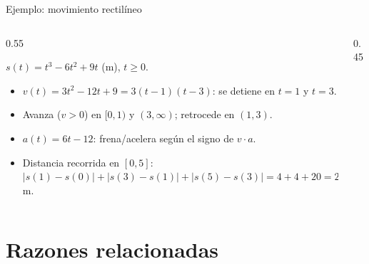 \documentclass[10pt,aspectratio=169]{beamer}
\begin{document}
\begin{frame}{Ejemplo: movimiento rectilíneo}
  \begin{columns}
    \begin{column}{0.55\textwidth}
      \begin{ejemplo}[2]
        $s(t)=t^3-6t^2+9t$ (m), $t\ge0$.
        \begin{itemize}
          \item $v(t)=3t^2-12t+9=3(t-1)(t-3)$: se detiene en $t=1$ y $t=3$.
          \item Avanza ($v>0$) en $[0,1)$ y $(3,\infty)$; retrocede en $(1,3)$.
          \item $a(t)=6t-12$: frena/acelera según el signo de $v\cdot a$.
          \item Distancia recorrida en $[0,5]$: $|s(1)-s(0)|+|s(3)-s(1)|+|s(5)-s(3)|=4+4+20=28$ m.
        \end{itemize}
      \end{ejemplo}
    \end{column}
    \begin{column}{0.45\textwidth}
      \centering
    \end{column}
  \end{columns}
\end{frame}

\section{Razones relacionadas}
\end{document}
